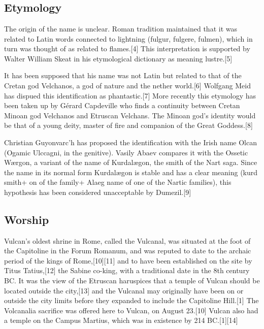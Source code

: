 \chapter{\docname}
\label{\docname}

\section{Etymology}
The origin of the name is unclear. Roman tradition maintained that it was related to Latin words connected to lightning (fulgur, fulgere, fulmen), which in turn was thought of as related to flames.[4] This interpretation is supported by Walter William Skeat in his etymological dictionary as meaning lustre.[5]

It has been supposed that his name was not Latin but related to that of the Cretan god Velchanos, a god of nature and the nether world.[6] Wolfgang Meid has dispued this identification as phantastic.[7] More recently this etymology has been taken up by Gérard Capdeville who finds a continuity between Cretan Minoan god Velchanos and Etruscan Velchans. The Minoan god's identity would be that of a young deity, master of fire and companion of the Great Goddess.[8]

Christian Guyonvarc'h has proposed the identification with the Irish name Olcan (Ogamic Ulccagni, in the genitive). Vasily Abaev compares it with the Ossetic Wærgon, a variant of the name of Kurdalægon, the smith of the Nart saga. Since the name in its normal form Kurdalægon is stable and has a clear meaning (kurd smith+ on of the family+ Alaeg name of one of the Nartic families), this hypothesis has been considered unacceptable by Dumezil.[9] 

\section{Worship}
Vulcan's oldest shrine in Rome, called the Vulcanal, was situated at the foot of the Capitoline in the Forum Romanum, and was reputed to date to the archaic period of the kings of Rome,[10][11] and to have been established on the site by Titus Tatius,[12] the Sabine co-king, with a traditional date in the 8th century BC. It was the view of the Etruscan haruspices that a temple of Vulcan should be located outside the city,[13] and the Vulcanal may originally have been on or outside the city limits before they expanded to include the Capitoline Hill.[1] The Volcanalia sacrifice was offered here to Vulcan, on August 23.[10] Vulcan also had a temple on the Campus Martius, which was in existence by 214 BC.[1][14]


